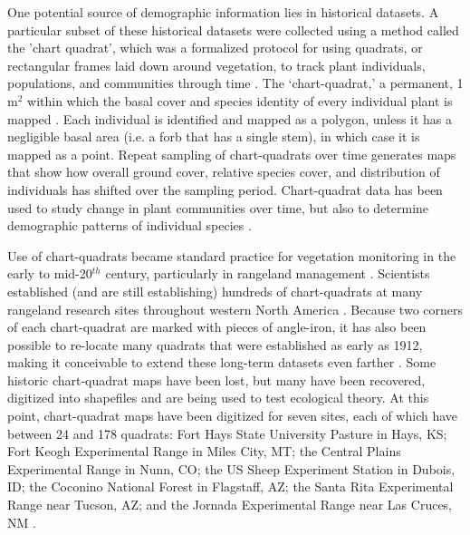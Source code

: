 \documentclass[12pt, letterpaper]{article}
\begin{document}
One potential source of demographic information lies in historical datasets. A particular subset of these historical datasets were collected using a method called the 'chart quadrat', which was a formalized protocol for using quadrats, or rectangular frames laid down around vegetation, to track plant individuals, populations, and communities through time \cite{Clements1907}. The ‘chart-quadrat,’ a permanent, 1 m$^2$ within which the basal cover and species identity of every individual plant is mapped \cite{Hill1920}. Each individual is identified and mapped as a polygon, unless it  has a negligible basal area (i.e. a forb that has a single stem), in which case it is mapped as a point. Repeat sampling of chart-quadrats over time generates maps that show how overall ground cover, relative species cover, and distribution of individuals has shifted over the sampling period. Chart-quadrat data has been used to study change in plant communities over time, but also to determine demographic patterns of individual species \cite{Albertson1965, Wright1976}.

Use of chart-quadrats became standard practice for vegetation monitoring in the early to mid-20$^{th}$ century, particularly in rangeland management \cite{Albertson1965, Hill1920}. Scientists established (and are still establishing) hundreds of chart-quadrats at many rangeland research sites throughout western North America \cite{Zachmann2010, Chu2013, Anderson2012, Anderson2011, Adler2007}. Because two corners of each chart-quadrat are marked with pieces of angle-iron, it has also been possible to re-locate many quadrats that were established as early as 1912, making it conceivable to extend these long-term datasets even farther \cite{Dowling2015, Adler2019}. Some historic chart-quadrat maps have been lost, but many have been recovered, digitized into shapefiles and are being used to test ecological theory. At this point, chart-quadrat maps have been digitized for seven sites, each of which have between 24 and 178 quadrats: Fort Hays State University Pasture in Hays, KS; Fort Keogh Experimental Range in Miles City, MT; the Central Plains Experimental Range in Nunn, CO; the US Sheep Experiment Station in Dubois, ID; the Coconino National Forest in Flagstaff, AZ; the Santa Rita Experimental Range near Tucson, AZ; and the Jornada Experimental Range near Las Cruces, NM \cite{Adler2007, Anderson2011, Zachmann2010, Chu2013, Anderson2012, Christensen2021Quadratbased19152016}. 
\end{document}
